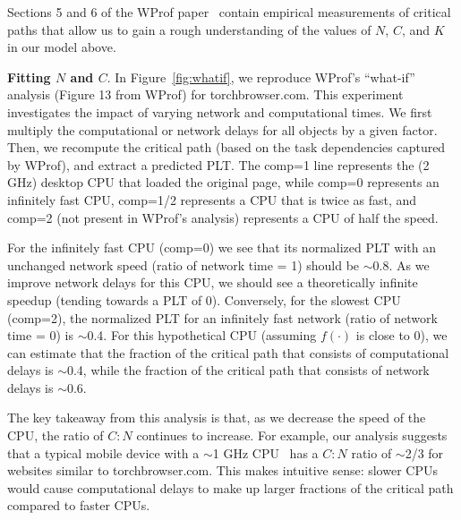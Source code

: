Sections 5 and 6 of the WProf paper~\cite{wang2013demystifying} contain
empirical measurements of critical paths that allow us to gain a rough
understanding of the values of $N$, $C$, and $K$ in our model
above.

{\bf Fitting $N$ and $C$}. In Figure~\ref{fig:whatif}, we reproduce WProf's
``what-if'' analysis (Figure 13 from WProf)
for torchbrowser.com.
This experiment investigates the impact of varying network and computational times.
We first multiply the computational or network delays for all objects by a given factor.
Then, we recompute the critical path (based on the task dependencies captured by WProf), and extract a predicted PLT.
The comp=1 line represents the (2 GHz) desktop CPU that loaded the original page, while comp=0
represents an infinitely fast CPU, comp=1/2 represents a CPU that is twice as fast, and
comp=2 (not present in WProf's analysis) represents a CPU
of half the speed.

For the infinitely fast CPU (comp=0) we see that its normalized PLT with an unchanged
network speed (ratio of network time = 1) should be
{\footnotesize$\sim$}0.8. As we improve network delays for this CPU, we should
see a theoretically infinite speedup (tending towards a PLT of 0).
Conversely, for
the slowest CPU (comp=2), the normalized PLT for an infinitely fast network (ratio of
network time = 0) is {\footnotesize$\sim$}0.4. For this hypothetical CPU (assuming $f(\cdot)$ is close
to 0), we can estimate that the fraction of the critical path that consists
of computational delays is {\footnotesize$\sim$}0.4, while the fraction of the
critical path that consists of network delays is {\footnotesize$\sim$}0.6.

The key takeaway from this analysis is that, as we decrease the speed of the
CPU, the ratio of $C:N$ continues to increase. 
For example, our analysis suggests that a typical mobile device with a {\footnotesize$\sim$}1 GHz CPU~\cite{mobile-stats} has a $C:N$ ratio of {\footnotesize$\sim$}2/3 for websites similar to torchbrowser.com.
This makes intuitive sense:
slower CPUs would cause computational delays to make up larger fractions of
the critical path compared to faster CPUs.


